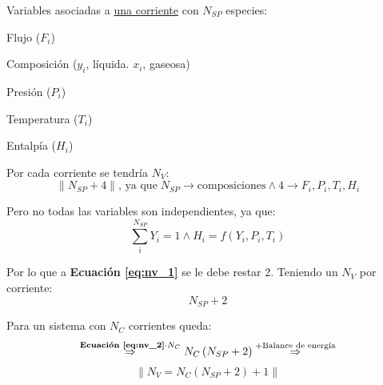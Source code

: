             
            Variables asociadas a \underline{una corriente} con \(N_{SP}\) especies:
            
            \begin{itemize}
                \begin{minipage}{0.45\linewidth}
                    \item Flujo (\(F_{i}\))
                    \item Composición (\(y_{i}\), líquida. \(x_{i}\), gaseosa)
                \end{minipage}
                \begin{minipage}{0.25\linewidth}
                    \item Presión (\(P_{i}\))
                    \item Temperatura (\(T_{i}\))
                \end{minipage}
                \begin{minipage}{0.2\linewidth}
                    \item Entalpía (\(H_{i}\))
                    \newline
                    \newline
                \end{minipage}
            \end{itemize}
            
            Por cada corriente se tendría \(N_{V}\):
            \begin{equation}
                \label{eq:nv_1}
                \left \| N_{SP} + 4 \right \|\text{, ya que}\;N_{SP}\rightarrow \text{composiciones}\wedge4\rightarrow F_{i}, P_{i}, T_{i}, H_{i}
            \end{equation}
            
            Pero no todas las variables son independientes, ya que:
            \[\sum_{i}^{N_{SP}} Y_{i} = 1 \wedge H_{i} = f(Y_{i}, P_{i}, T_{i})\]
            
            Por lo que a \textbf{Ecuación \ref{eq:nv_1}} se le debe restar 2. Teniendo un \(N_{V}\) por corriente:
            \begin{equation}
            \label{eq:nv_2}
                N_{SP} + 2
            \end{equation}
            
            Para un sistema con \(N_{C}\) corrientes queda:
            \[\overset{\text{\textbf{Ecuación \ref{eq:nv_2}}} \cdot N_{C}}{\Rightarrow} N_{C}\left ( N_{SP} + 2 \right ) \overset{+\text{Balance de energía}}{\Rightarrow}\]
            \begin{equation}
            \label{variables_por_corriente}
                \left \| N_{V} = N_{C}\left ( N_{SP} + 2 \right ) + 1 \right \|
            \end{equation}
            
